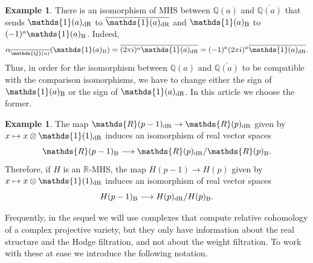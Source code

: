 \documentclass[11pt,a4paper]{amsart}
\newcommand{\Betti}{\text{\rm B}}
\newcommand{\dR}{\text{\rm dR}}
\newcommand{\Q}{\mathds{Q}}
\newcommand{\R}{\mathds{R}}
\newcommand{\bfone}{{\mathds{1}}}
\numberwithin{equation}{section}
\theoremstyle{plain}
\theoremstyle{definition}
\newtheorem{ex}[prop]{Example}
\begin{document}
\begin{ex}\label{exm:8}
  There is an isomorphism of MHS between $\Q(a)$ and
  $\overline{\Q(a)}$ that sends $\bfone(a)_{\dR}$ to $\overline
  {\bfone(a)_{\dR}}$ and $\bfone(a)_{\Betti}$ to $(-1)^{a}\bfone(a)_{\Betti}$.  Indeed,
  \begin{displaymath}
    \alpha_ {\overline {\Q(a)}}(\bfone(a)_{\Betti})=\overline {(2\pi
      i)^a\bfone(a)_{\dR}} =(-1)^{a}(2\pi
      i)^a \overline {\bfone(a)_{\dR}}. 
    \end{displaymath}
    Thus, in order for the isomorphism between $\Q(a)$ and
  $\overline{\Q(a)}$ to be compatible with the comparison isomorphisms,
  we have to change either the sign of $\bfone(a)_{\Betti}$ or the sign of
  $\bfone(a)_{\dR}$. In this article we choose the former.   
\end{ex}

\begin{ex}\label{exm:11}  The map $\R(p-1)_{\dR}\to \R(p)_{\dR}$ given by 
  $x\mapsto x\otimes \bfone(1)_{\dR}$ induces an isomorphism
  of real vector spaces
  \begin{displaymath}
    \R(p-1)_{\Betti}\longrightarrow \R(p)_{\dR}/\R(p)_{\Betti}.
  \end{displaymath}
Therefore, if $H$ is an $\R$-MHS, the map
  $H(p-1)\to H(p)$ given by $x\mapsto x\otimes \bfone(1)_{\dR}$
  induces an isomorphism of real vector spaces
  \begin{displaymath}
    H(p-1)_{\Betti}\longrightarrow H(p)_{\dR}/H(p)_{\Betti}.
  \end{displaymath}
\end{ex}

Frequently, in the sequel we will use complexes that compute relative
cohomology of a complex projective variety, but they only have
information about the real structure and the Hodge filtration, and
not about the weight filtration. To work with these at ease we
introduce the following notation.  
\end{document}
